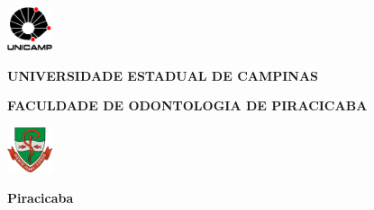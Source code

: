 \thispagestyle{plain}
\noindent%
\includegraphics[width=0.10\textwidth]{imagens/logo-unicamp}%
\begin{minipage}[b]{0.7\textwidth}
	\centering
	\textbf{UNIVERSIDADE ESTADUAL DE CAMPINAS} \\
\vspace{0.5cm}

\textbf{FACULDADE DE ODONTOLOGIA DE PIRACICABA}
\end{minipage}%
\includegraphics[width=0.10\textwidth]{imagens/logo-fop}

\vspace{4cm}
\begin{center}
	{\Large\textsc{\autor}}
\end{center}
\vspace{4cm}
\begin{center}
	{\Large\textbf{\textsc{\titulo}}}
\end{center}
\vfill
\begin{center}
	\textbf{Piracicaba \\ \ano}
\end{center}





\cleardoublepage


\thispagestyle{plain}


\begin{center}
	
	{\large\textbf{\textsc{\autor}}}
	
	
\end{center}
\vfill


\vfill
\begin{center}
	{\Large\textbf{\textsc{\titulo}}}
\end{center}
\vfill

